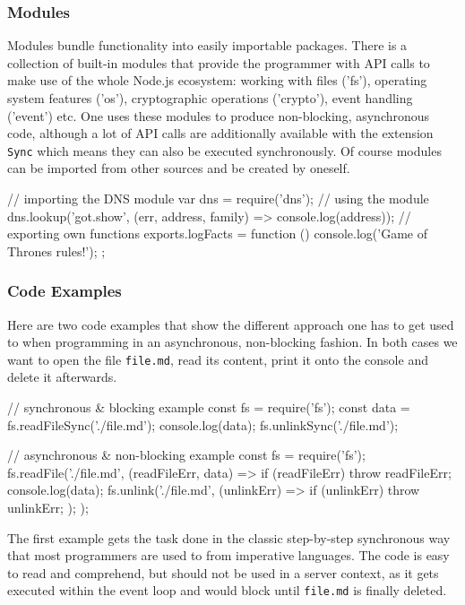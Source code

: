\documentclass{bioinfo}
\begin{document}
\subsubsection{Modules}

Modules bundle functionality into easily importable packages. There is a collection of built-in modules that provide the programmer with API calls to make use of the whole Node.js ecosystem: working with files ('fs'), operating system features ('os'), cryptographic operations ('crypto'), event handling ('event') etc. One uses these modules to produce non-blocking, asynchronous code, although a lot of API calls are additionally available with the extension \texttt{Sync} which means they can also be executed synchronously. Of course modules can be imported from other sources and be created by oneself. \cite{nodejsmodules}
\begin{verbatim*}
    // importing the DNS module
    var dns = require('dns');
    // using the module
    dns.lookup('got.show', (err, address, family)
        => console.log(address));
    // exporting own functions
    exports.logFacts = function () {
      console.log('Game of Thrones rules!');
    };
\end{verbatim*}
\subsubsection{Code Examples}
Here are two code examples \cite{nodejscodeexample} that show the different approach one has to get used to when programming in an asynchronous, non-blocking fashion. In both cases we want to open the file \texttt{file.md}, read its content, print it onto the console and delete it afterwards.
\begin{verbatim*}
    // synchronous & blocking example
    const fs = require('fs');
    const data = fs.readFileSync('./file.md');
    console.log(data);
    fs.unlinkSync('./file.md');

    // asynchronous & non-blocking example
    const fs = require('fs');
    fs.readFile('./file.md',
      (readFileErr, data) => {
        if (readFileErr) throw readFileErr;
        console.log(data);
        fs.unlink('./file.md', (unlinkErr) => {
            if (unlinkErr) throw unlinkErr;
        });
    });
\end{verbatim*}
The first example gets the task done in the classic step-by-step synchronous way that most programmers are used to from imperative languages. The code is easy to read and comprehend, but should not be used in a server context, as it gets executed within the event loop and would block until \texttt{file.md} is finally deleted.
\end{document}
